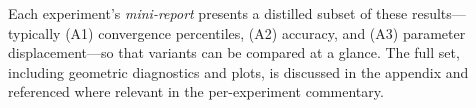 Each experiment’s \emph{mini-report} presents a distilled subset of these
results—typically (A1) convergence percentiles, (A2) accuracy, and (A3)
parameter displacement—so that variants can be compared at a glance.  The full
set, including geometric diagnostics and plots, is discussed in the appendix
and referenced where relevant in the per-experiment commentary.
